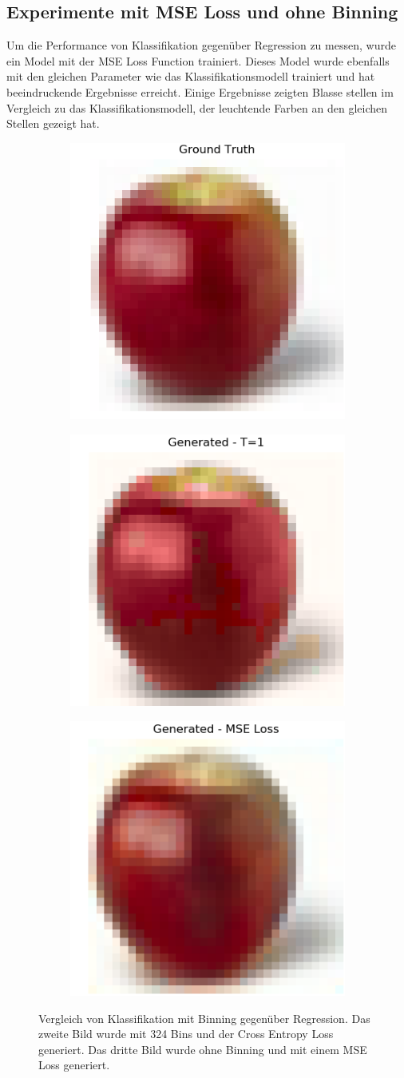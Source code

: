 \subsection{Experimente mit MSE Loss und ohne Binning}
Um die Performance von Klassifikation gegenüber Regression zu messen, wurde ein Model mit der MSE Loss Function trainiert. Dieses Model
wurde ebenfalls mit den gleichen Parameter wie das Klassifikationsmodell trainiert und hat beeindruckende Ergebnisse erreicht. Einige Ergebnisse
zeigten Blasse stellen im Vergleich zu das Klassifikationsmodell, der leuchtende Farben an den gleichen Stellen gezeigt hat.

\begin{figure}[H]
  \centering
  \vspace{1cm}
  \begin{subfigure}
    \centering
    \includegraphics[width=.28\textwidth]{resources/experiments/cifar/311_original.png}
  \end{subfigure}
  \begin{subfigure}
    \centering
    \includegraphics[width=.28\textwidth]{resources/experiments/cifar/311_t1.png}
  \end{subfigure}
  \begin{subfigure}
    \centering
    \includegraphics[width=.28\textwidth]{resources/experiments/cifar/311_regression.png}
  \end{subfigure}

  \caption{Vergleich von Klassifikation mit Binning gegenüber Regression. Das zweite Bild wurde mit 324 Bins und der Cross Entropy Loss generiert.
  Das dritte Bild wurde ohne Binning und mit einem MSE Loss generiert.}
  \label{image:gute-ergebnisse-cifar}
\end{figure}


